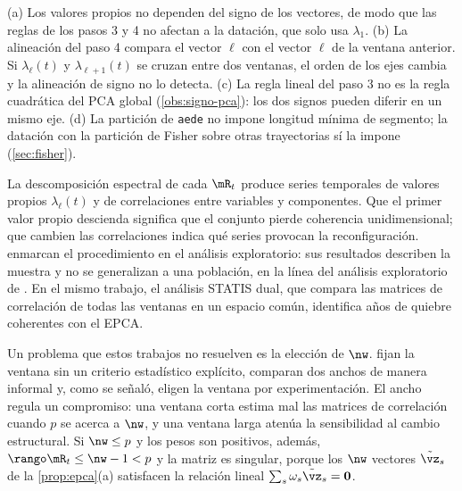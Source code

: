 \begin{observacion}\label{obs:aede}
(a) Los valores propios no dependen del signo de los vectores, de modo que las reglas de los pasos
3 y 4 no afectan a la datación, que solo usa $\lambda_1$. (b) La alineación del paso 4 compara el
vector $\ell$ con el vector $\ell$ de la ventana anterior. Si $\lambda_\ell(t)$ y
$\lambda_{\ell+1}(t)$ se cruzan entre dos ventanas, el orden de los ejes cambia y la alineación
de signo no lo detecta. (c) La regla lineal del paso 3 no es la regla cuadrática del PCA global
(\cref{obs:signo-pca}): los dos signos pueden diferir en un mismo eje. (d) La partición de
\texttt{aede} no impone longitud mínima de segmento; la datación con la partición de Fisher sobre
otras trayectorias sí la impone (\cref{sec:fisher}).
\end{observacion}

La descomposición espectral de cada $\mR_t$ produce series temporales de valores propios
$\lambda_\ell(t)$ y de correlaciones entre variables y componentes. Que el primer valor propio
descienda significa que el conjunto pierde coherencia unidimensional; que cambien las
correlaciones indica qué series provocan la reconfiguración.
\textcite{camiz_maulucci_roig_2010} enmarcan el procedimiento en el análisis exploratorio: sus
resultados describen la muestra y no se generalizan a una población, en la línea del análisis
exploratorio de \textcite{tukey_1977}. En el mismo trabajo, el análisis STATIS dual, que compara las matrices de correlación de
todas las ventanas en un espacio común, identifica años de quiebre coherentes con el EPCA.

Un problema que estos trabajos no resuelven es la elección de $\nw$.
\textcite{camiz_maulucci_roig_2010} fijan la ventana sin un criterio estadístico explícito,
\textcite{camiz_roig_2011} comparan dos anchos de manera informal y, como se señaló,
\textcite{camiz_cerda_atoche_2026} eligen la ventana por experimentación. El ancho regula un
compromiso: una ventana corta estima mal las matrices de correlación cuando $p$ se acerca a $\nw$,
y una ventana larga atenúa la sensibilidad al cambio estructural. Si $\nw\le p$ y los pesos son positivos, además,
$\rango\mR_t\le\nw-1<p$ y la matriz es singular, porque los $\nw$ vectores
$\tilde\vz_s$ de la \cref{prop:epca}(a) satisfacen la relación lineal
$\sum_s\omega_s\tilde\vz_s=\mathbf{0}$.

